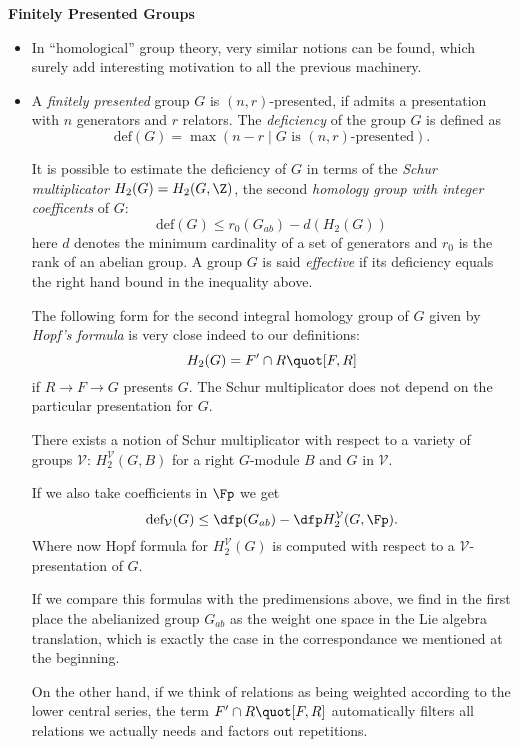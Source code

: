 \documentclass[a4paper,11pt,german,english]{report}
\begin{document}
\newpage
\indent
{\bf Finitely Presented Groups}
\begin{itemize}
\item[]In ``homological'' group theory, very similar notions can be found, which surely add interesting motivation to
all the previous machinery.


\item[]A {\em finitely presented} group $G$ is $(n,r)$-presented, if admits a presentation
with $n$ generators and $r$ relators. The {\em deficiency} of the group $G$ is defined as
$$\mathrm{def}(G)=\max(n-r\mid G\,\,\text{is $(n, r)$-presented}).$$

It is possible to estimate the deficiency of $G$ in terms of the {\em Schur multiplicator}
$H_{2}(G)=H_{2}(G,\Z)$, the second {\em homology group with integer coefficents} of $G$:
$$\text{def}(G)\leq r_{0}(G_{ab})-d(H_{2}(G))$$
here $d$ denotes the minimum cardinality of a set of generators and $r_{0}$ is the rank of an abelian group.
A group $G$ is said {\em effective} if its deficiency equals the right hand bound in the inequality above.

The following form for the second integral homology group of $G$ given by {\em Hopf's
formula} is very close indeed to our definitions:
$$H_{2}(G)=F^{\prime}\cap R\quot [F,R]$$
if $R\to F\to G$ presents $G$. The Schur multiplicator does not depend on the particular
presentation for $G$.

There exists a notion of Schur multiplicator with respect to a variety of groups $\mathcal{V}$:
$H^{\mathcal{V}}_{2}(G,B)$ for a right $G$-module $B$ and $G$ in $\mathcal{V}$.

If we also take coefficients in $\Fp$ we get
$$\mathrm{def_{\mathcal{V}}}(G)\leq\dfp(G_{ab})-\dfp H_{2}^{\mathcal{V}}(G,\Fp).$$
Where now Hopf formula for $H_{2}^{\mathcal{V}}(G)$ is computed with respect
to a $\mathcal{V}$-presentation of $G$.

If we compare this formulas with the predimensions above, we find in the first
place the abelianized group $G_{ab}$ as the weight one space in the
Lie algebra translation, which is exactly the case in the correspondance we mentioned at the beginning.

On the other hand, if we think of relations as being weighted according to the lower central series, the term $F^{\prime}\cap R\quot [F,R]$ automatically filters
all relations we actually needs and factors out repetitions.


\end{itemize}
\end{document}
